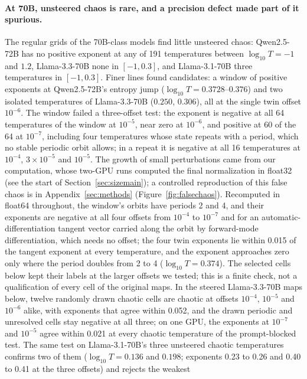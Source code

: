\documentclass[11pt,letterpaper]{article}
\begin{document}
\paragraph{At 70B, unsteered chaos is rare, and a precision defect made part of it spurious.} The regular grids of the
70B-class models find little unsteered chaos: Qwen2.5-72B has no positive exponent at any of 191 temperatures between
$\log_{10}T=-1$ and $1.2$, Llama-3.3-70B none in $[-1,0.3]$, and Llama-3.1-70B three temperatures in $[-1,0.3]$.
Finer lines found candidates: a window of positive exponents at Qwen2.5-72B's entropy jump
($\log_{10}T=0.3728$--$0.376$) and two isolated temperatures of Llama-3.3-70B ($0.250$, $0.306$), all at the single
twin offset $10^{-6}$. The window failed a three-offset test: the exponent is negative at all 64 temperatures of the
window at $10^{-5}$, near zero at $10^{-6}$, and positive at 60 of the 64 at $10^{-7}$, including four temperatures whose
state repeats with a period, which no stable periodic orbit allows; in a repeat it is negative at all 16 temperatures
at $10^{-4}$, $3\times10^{-5}$ and $10^{-5}$. The growth of small perturbations came from our computation, whose
two-GPU runs computed the final normalization in float32 (see the start of Section~\ref{sec:sizemain}); a controlled
reproduction of this false chaos is in Appendix~\ref{sec:methods} (Figure~\ref{fig:falsechaos}). Recomputed in float64
throughout, the window's orbits have periods 2 and 4, and their exponents are negative at all four offsets from
$10^{-4}$ to $10^{-7}$ and for an automatic-differentiation tangent vector carried along the orbit by forward-mode differentiation, which
needs no offset; the four twin exponents lie within 0.015 of the tangent exponent at every temperature, and the
exponent approaches zero only
where the period doubles from 2 to 4 ($\log_{10}T=0.374$). The selected cells below kept their labels at the larger
offsets we tested; this is a finite check, not a qualification of every cell of the original maps. In
the steered Llama-3.3-70B maps below, twelve randomly drawn chaotic cells are chaotic at offsets $10^{-4}$, $10^{-5}$
and $10^{-6}$ alike, with exponents that agree within 0.052, and the drawn periodic and unresolved cells stay negative
at all three; on one GPU, the exponents at $10^{-7}$ and $10^{-5}$ agree within 0.021 at every chaotic temperature of the
prompt-blocked test. The same test on Llama-3.1-70B's three unsteered chaotic temperatures confirms two of them
($\log_{10}T=0.136$ and $0.198$; exponents 0.23 to 0.26 and 0.40 to 0.41 at the three offsets) and rejects the weakest
\end{document}

